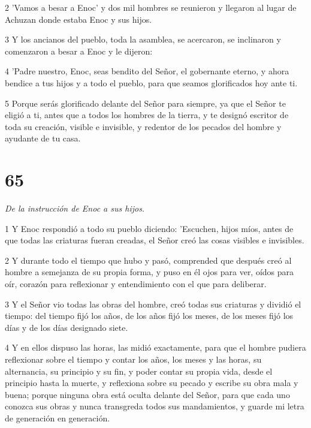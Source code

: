 \par 2 'Vamos a besar a Enoc' y dos mil hombres se reunieron y llegaron al lugar de Achuzan donde estaba Enoc y sus hijos.

\par 3 Y los ancianos del pueblo, toda la asamblea, se acercaron, se inclinaron y comenzaron a besar a Enoc y le dijeron:

\par 4 'Padre nuestro, Enoc, seas bendito del Señor, el gobernante eterno, y ahora bendice a tus hijos y a todo el pueblo, para que seamos glorificados hoy ante ti.

\par 5 Porque serás glorificado delante del Señor para siempre, ya que el Señor te eligió a ti, antes que a todos los hombres de la tierra, y te designó escritor de toda su creación, visible e invisible, y redentor de los pecados del hombre y ayudante de tu casa.

\chapter{65}

\par \textit{De la instrucción de Enoc a sus hijos.}

\par 1 Y Enoc respondió a todo su pueblo diciendo: 'Escuchen, hijos míos, antes de que todas las criaturas fueran creadas, el Señor creó las cosas visibles e invisibles.

\par 2 Y durante todo el tiempo que hubo y pasó, comprended que después creó al hombre a semejanza de su propia forma, y ​​puso en él ojos para ver, oídos para oír, corazón para reflexionar y entendimiento con el que para deliberar.

\par 3 Y el Señor vio todas las obras del hombre, creó todas sus criaturas y dividió el tiempo: del tiempo fijó los años, de los años fijó los meses, de los meses fijó los días y de los días designado siete.

\par 4 Y en ellos dispuso las horas, las midió exactamente, para que el hombre pudiera reflexionar sobre el tiempo y contar los años, los meses y las horas, su alternancia, su principio y su fin, y poder contar su propia vida, desde el principio hasta la muerte, y reflexiona sobre su pecado y escribe su obra mala y buena; porque ninguna obra está oculta delante del Señor, para que cada uno conozca sus obras y nunca transgreda todos sus mandamientos, y guarde mi letra de generación en generación.

